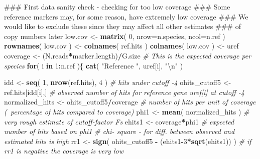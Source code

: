 \documentclass[]{article}
\newenvironment{Shaded}{\begin{snugshade}}{\end{snugshade}}
\newcommand{\KeywordTok}[1]{\textcolor[rgb]{0.13,0.29,0.53}{\textbf{#1}}}
\newcommand{\DataTypeTok}[1]{\textcolor[rgb]{0.13,0.29,0.53}{#1}}
\newcommand{\DecValTok}[1]{\textcolor[rgb]{0.00,0.00,0.81}{#1}}
\newcommand{\CharTok}[1]{\textcolor[rgb]{0.31,0.60,0.02}{#1}}
\newcommand{\StringTok}[1]{\textcolor[rgb]{0.31,0.60,0.02}{#1}}
\newcommand{\CommentTok}[1]{\textcolor[rgb]{0.56,0.35,0.01}{\textit{#1}}}
\newcommand{\ControlFlowTok}[1]{\textcolor[rgb]{0.13,0.29,0.53}{\textbf{#1}}}
\newcommand{\OperatorTok}[1]{\textcolor[rgb]{0.81,0.36,0.00}{\textbf{#1}}}
\newcommand{\NormalTok}[1]{#1}
\begin{document}
\begin{Shaded}
\begin{Highlighting}[]
\NormalTok{### First data sanity check - checking for too low coverage}
\NormalTok{### Some reference markers may, for some reason, have extremely low coverage}
\NormalTok{### We would like to exclude these since they may affect all other estimates}
\NormalTok{### of copy numbers later}
\NormalTok{low.cov <-}\StringTok{ }\KeywordTok{matrix}\NormalTok{( }\DecValTok{0}\NormalTok{, }\DataTypeTok{nrow=}\NormalTok{n.species, }\DataTypeTok{ncol=}\NormalTok{n.ref )}
\KeywordTok{rownames}\NormalTok{( low.cov ) <-}\StringTok{ }\KeywordTok{colnames}\NormalTok{( ref.hits )}
\KeywordTok{colnames}\NormalTok{( low.cov ) <-}\StringTok{ }\NormalTok{uref}
\NormalTok{coverage <-}\StringTok{ }\NormalTok{(N.reads}\OperatorTok{*}\NormalTok{marker.length)}\OperatorTok{/}\NormalTok{G.size    }\CommentTok{# This is the expected coverage per species}
\ControlFlowTok{for}\NormalTok{( i }\ControlFlowTok{in} \DecValTok{1}\OperatorTok{:}\NormalTok{n.ref )\{}
  \KeywordTok{cat}\NormalTok{( }\StringTok{"Reference "}\NormalTok{, uref[i], }\StringTok{"}\CharTok{\textbackslash{}n}\StringTok{"}\NormalTok{ )}
  
\NormalTok{  idd <-}\StringTok{ }\KeywordTok{seq}\NormalTok{( }\DecValTok{1}\NormalTok{, }\KeywordTok{nrow}\NormalTok{(ref.hits), }\DecValTok{4}\NormalTok{ )                          }\CommentTok{# hits under cutoff -4}
\NormalTok{  ohits_cutoff5 <-}\StringTok{ }\NormalTok{ref.hits[idd[i],]                          }\CommentTok{# observed number of hits for reference gene uref[i] at cutoff -4}
\NormalTok{  normalized_hits <-}\StringTok{ }\NormalTok{ohits_cutoff5}\OperatorTok{/}\NormalTok{coverage                   }\CommentTok{# number of hits per unit of coverage (~percentage of hits compared to coverage)}
\NormalTok{  phi1 <-}\StringTok{ }\KeywordTok{mean}\NormalTok{( normalized_hits )                             }\CommentTok{# very rough estimate of cutoff-factor Fs}
\NormalTok{  ehits1 <-}\StringTok{ }\NormalTok{coverage}\OperatorTok{*}\NormalTok{phi1                                     }\CommentTok{# expected number of hits based on phi1}
  \CommentTok{# chi- square - for diff. between observed and estimated hits is high}
\NormalTok{  rr1 <-}\StringTok{ }\KeywordTok{sign}\NormalTok{( ohits_cutoff5 }\OperatorTok{-}\StringTok{ }\NormalTok{(ehits1}\OperatorTok{-}\DecValTok{3}\OperatorTok{*}\KeywordTok{sqrt}\NormalTok{(ehits1)) )      }\CommentTok{# if rr1 is negative the coverage is very low}
 

\end{Highlighting}
\end{Shaded}
\end{document}
